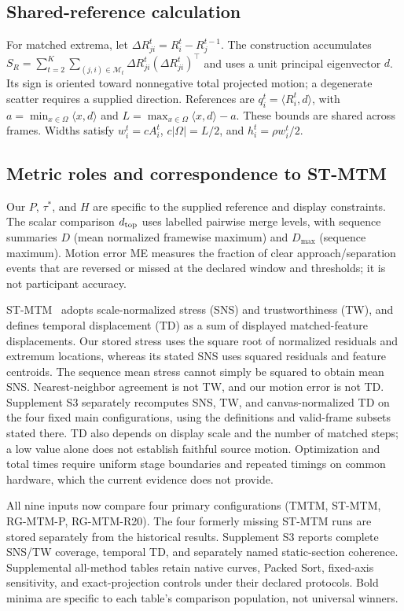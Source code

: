 \subsection{Shared-reference calculation}
For matched extrema, let $\Delta R_{ji}^{t}=R_i^t-R_j^{t-1}$. The construction accumulates $S_R=\sum_{t=2}^{K}\sum_{(j,i)\in\mathcal M_t}\Delta R_{ji}^{t}(\Delta R_{ji}^{t})^\top$ and uses a unit principal eigenvector $d$. Its sign is oriented toward nonnegative total projected motion; a degenerate scatter requires a supplied direction. References are $q_i^t=\langle R_i^t,d\rangle$, with $a=\min_{x\in\Omega}\langle x,d\rangle$ and $L=\max_{x\in\Omega}\langle x,d\rangle-a$. These bounds are shared across frames. Widths satisfy $w_i^t=cA_i^t$, $c|\Omega|=L/2$, and $h_i^t=\rho w_i^t/2$.

\subsection{Metric roles and correspondence to ST-MTM}
Our $P$, $\tau^*$, and $H$ are specific to the supplied reference and display constraints. The scalar comparison $d_{\mathrm{top}}$ uses labelled pairwise merge levels, with sequence summaries $D$ (mean normalized framewise maximum) and $D_{\max}$ (sequence maximum). Motion error ME measures the fraction of clear approach/separation events that are reversed or missed at the declared window and thresholds; it is not participant accuracy.

ST-MTM~\cite{STMTM:2026} adopts scale-normalized stress (SNS) and trustworthiness (TW), and defines temporal displacement (TD) as a sum of displayed matched-feature displacements. Our stored stress uses the square root of normalized residuals and extremum locations, whereas its stated SNS uses squared residuals and feature centroids. The sequence mean stress cannot simply be squared to obtain mean SNS. Nearest-neighbor agreement is not TW, and our motion error is not TD. Supplement S3 separately recomputes SNS, TW, and canvas-normalized TD on the four fixed main configurations, using the definitions and valid-frame subsets stated there. TD also depends on display scale and the number of matched steps; a low value alone does not establish faithful source motion. Optimization and total times require uniform stage boundaries and repeated timings on common hardware, which the current evidence does not provide.

All nine inputs now compare four primary configurations (TMTM, ST-MTM, RG-MTM-P, RG-MTM-R20). The four formerly missing ST-MTM runs are stored separately from the historical results. Supplement S3 reports complete SNS/TW coverage, temporal TD, and separately named static-section coherence. Supplemental all-method tables retain native curves, Packed Sort, fixed-axis sensitivity, and exact-projection controls under their declared protocols. Bold minima are specific to each table's comparison population, not universal winners.


